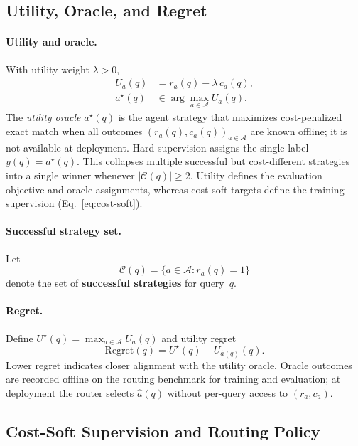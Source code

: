 \subsection{Utility, Oracle, and Regret}
\label{sec:formal-reduction}

\paragraph{Utility and oracle.}
With utility weight $\lambda>0$,
\begin{align}
  U_a(q) &= r_a(q)-\lambda\,c_a(q),
  \label{eq:utility} \\
  a^\star(q) &\in \arg\max_{a\in\mathcal{A}} U_a(q).
  \label{eq:hard-oracle}
\end{align}
The \emph{utility oracle} $a^\star(q)$ is the agent strategy that maximizes cost-penalized exact
match when all outcomes $(r_a(q),c_a(q))_{a\in\mathcal{A}}$ are known offline; it is not available
at deployment.
Hard supervision assigns the single label $y(q)=a^\star(q)$.
This collapses multiple successful but cost-different strategies into a single winner whenever
$|\mathcal{C}(q)|\ge 2$.
Utility defines the evaluation objective and oracle assignments, whereas cost-soft targets
define the training supervision (Eq.~\ref{eq:cost-soft}).

\paragraph{Successful strategy set.}
Let
\begin{equation}
  \mathcal{C}(q)=\{a\in\mathcal{A}: r_a(q)=1\}
  \label{eq:correct-set}
\end{equation}
denote the set of \textbf{successful strategies} for query~$q$.

\paragraph{Regret.}
Define $U^\star(q)=\max_{a\in\mathcal{A}} U_a(q)$ and utility regret
\begin{equation}
  \mathrm{Regret}(q)=U^\star(q)-U_{\hat{a}(q)}(q).
  \label{eq:regret}
\end{equation}
Lower regret indicates closer alignment with the utility oracle.
Oracle outcomes are recorded offline on the routing benchmark for training and evaluation; at
deployment the router selects $\hat{a}(q)$ without per-query access to $(r_a,c_a)$.

\subsection{Cost-Soft Supervision and Routing Policy}
\label{sec:routing-policy}

